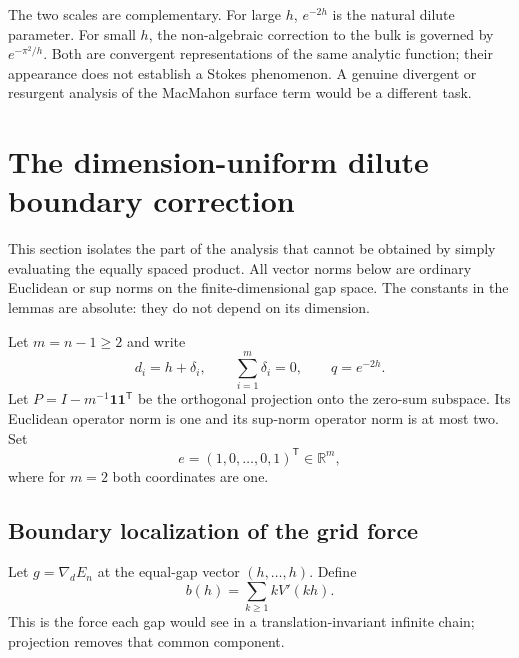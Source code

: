\documentclass[11pt,a4paper]{article}
\theoremstyle{definition}
\theoremstyle{remark}
\newcommand{\R}{\mathbb R}
\newcommand{\ones}{\mathbf 1}
\begin{document}
The two scales are complementary. For large $h$, $e^{-2h}$ is the
natural dilute parameter. For small $h$, the non-algebraic correction to
the bulk is governed by $e^{-\pi^2/h}$. Both are convergent representations
of the same analytic function; their appearance does not establish a
Stokes phenomenon. A genuine divergent or resurgent analysis of the
MacMahon surface term would be a different task.

\section{The dimension-uniform dilute boundary correction}
\label{sec:boundary}

This section isolates the part of the analysis that cannot be obtained by
simply evaluating the equally spaced product. All vector norms below are
ordinary Euclidean or sup norms on the finite-dimensional gap space.
The constants in the lemmas are absolute: they do not depend on its
dimension.

Let $m=n-1\ge2$ and write
\begin{equation}
 d_i=h+\delta_i,\qquad\sum_{i=1}^m\delta_i=0,
 \qquad q=e^{-2h}.
 \label{eq:gapsdelta}
\end{equation}
Let $P=I-m^{-1}\ones\ones^{\mathsf T}$ be the orthogonal projection onto
the zero-sum subspace. Its Euclidean operator norm is one and its sup-norm
operator norm is at most two. Set
\begin{equation}
 e=(1,0,\ldots,0,1)^{\mathsf T}\in\R^m,
 \label{eq:edgevector}
\end{equation}
where for $m=2$ both coordinates are one.

\subsection{Boundary localization of the grid force}
Let $g=\nabla_d E_n$ at the equal-gap vector $(h,\ldots,h)$. Define
\begin{equation}
 b(h)=\sum_{k\ge1}kV'(kh).
 \label{eq:bulkforce}
\end{equation}
This is the force each gap would see in a translation-invariant infinite
chain; projection removes that common component.
\end{document}
